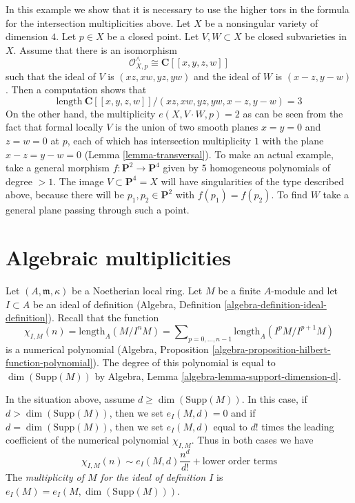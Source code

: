 \begin{example}
\label{example-naive-multiplicity-wrong}
In this example we show that it is necessary to use the higher
tors in the formula for the intersection multiplicities above.
Let $X$ be a nonsingular variety of dimension $4$.
Let $p \in X$ be a closed point. Let $V, W \subset X$
be closed subvarieties in $X$. Assume that there is an
isomorphism
$$
\mathcal{O}_{X, p}^\wedge \cong \mathbf{C}[[x, y, z, w]]
$$
such that the ideal of $V$ is $(xz, xw, yz, yw)$ and the ideal
of $W$ is $(x - z, y - w)$. Then a computation shows that
$$
\text{length}\ \mathbf{C}[[x, y, z, w]]/
(xz, xw, yz, yw, x - z, y - w) = 3
$$
On the other hand, the multiplicity $e(X, V \cdot W, p) = 2$
as can be seen from the fact that formal locally $V$ is the
union of two smooth planes $x = y = 0$ and $z = w = 0$ at $p$,
each of which has intersection multiplicity $1$ with the plane
$x - z = y - w = 0$ (Lemma \ref{lemma-transversal}). To make an
actual example, take
a general morphism $f : \mathbf{P}^2 \to \mathbf{P}^4$ given by
$5$ homogeneous polynomials of degree $> 1$. The image
$V \subset \mathbf{P}^4 = X$ will have singularities of the type
described above, because there will be $p_1, p_2 \in \mathbf{P}^2$
with $f(p_1) = f(p_2)$. To find $W$ take a general plane passing
through such a point.
\end{example}






\section{Algebraic multiplicities}
\label{section-multiplicities}

\noindent
Let $(A, \mathfrak m, \kappa)$ be a Noetherian local ring.
Let $M$ be a finite $A$-module and let $I \subset A$ be an ideal
of definition (Algebra, Definition \ref{algebra-definition-ideal-definition}).
Recall that the function
$$
\chi_{I, M}(n) = \text{length}_A(M/I^nM) =
\sum\nolimits_{p = 0, \ldots, n - 1} \text{length}_A(I^pM/I^{p + 1}M)
$$
is a numerical polynomial
(Algebra, Proposition \ref{algebra-proposition-hilbert-function-polynomial}).
The degree of this polynomial is equal to $\dim(\text{Supp}(M))$ by
Algebra, Lemma \ref{algebra-lemma-support-dimension-d}.

\begin{definition}
\label{definition-multiplicity}
In the situation above, assume $d \geq \dim(\text{Supp}(M))$.
In this case, if  $d > \dim(\text{Supp}(M))$, then we set $e_I(M, d) = 0$
and if $d = \dim(\text{Supp}(M))$, then we set $e_I(M, d)$ equal to $d!$
times the leading coefficient of the numerical polynomial $\chi_{I, M}$.
Thus in both cases we have
$$
\chi_{I, M}(n) \sim e_I(M, d) \frac{n^d}{d!} + \text{lower order terms}
$$
The {\it multiplicity of $M$ for the ideal of definition $I$}
is $e_I(M) = e_I(M, \dim(\text{Supp}(M)))$.
\end{definition}

